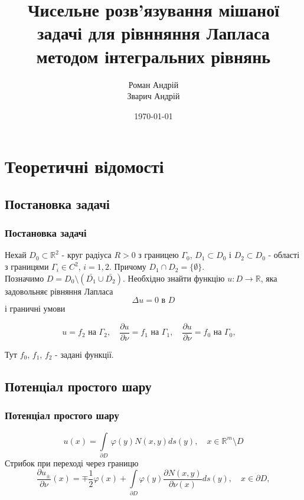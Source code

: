 \documentclass[10pt]{beamer}
\begin{document}
\title[]{Чисельне розв'язування мішаної задачі для рівнняння Лапласа методом інтегральних рівнянь}
\author{{Роман Андрій}\\ {Зварич Андрій}}
\date{\today}

\begin{frame}
\titlepage
\end{frame}

\begin{frame}
\tableofcontents
\end{frame}

\section{Теоретичні відомості}
\subsection{Постановка задачі}
\begin{frame}
\frametitle{Постановка задачі}
\hspace*{\parindent}Нехай $D_0\subset \mathbb{R}^2$ - круг радіуса $R>0$ з границею $\Gamma_0$, $D_1\subset D_0$ і $D_2\subset D_0$ - області з границями $\Gamma_i\in C^2$, $i=1,2$. Причому $D_1\cap D_2=\{\emptyset\}$.\\ 
\hspace*{\parindent}Позначимо $D=D_0\setminus (\bar{D_1}\cup\bar{D_2})$. Необхідно знайти функцію $u:D \rightarrow \mathbb{R}$, яка задовольняє рівняння Лапласа
\begin{equation}
\Delta u=0\text{ в }D
\end{equation}
і граничні умови 

\begin{equation}
		u = f_2 \mbox{  на  }  \Gamma_2 ,\quad
		\frac{\partial u}{\partial \nu} = f_1 \mbox{  на  }  \Gamma_1 ,\quad
		\frac{\partial u}{\partial \nu} = f_0 \mbox{  на  } \Gamma_0 ,\quad
\end{equation}

Тут $f_0$, $f_1$, $f_2$ - задані функції.
\end{frame}

\subsection{Потенціал простого шару}
\begin{frame}
\frametitle{Потенціал простого шару}
\begin{equation*}
u(x) = \int\limits_{\partial{D}} \, \varphi(y)N(x,y) ds(y) , \quad x \in \mathbb{R}^m\setminus D
\end{equation*}
Стрибок при переході через границю
\begin{equation}\label{4}
\frac{\partial u_\pm}{\partial\nu}(x)=\mp\frac{1}{2}\varphi(x)+\int\limits_{\partial D}\varphi(y)\frac{\partial N(x,y)}{\partial\nu(x)} ds(y) , \quad x \in \partial D,
\end{equation}
\end{frame}
\end{document}
